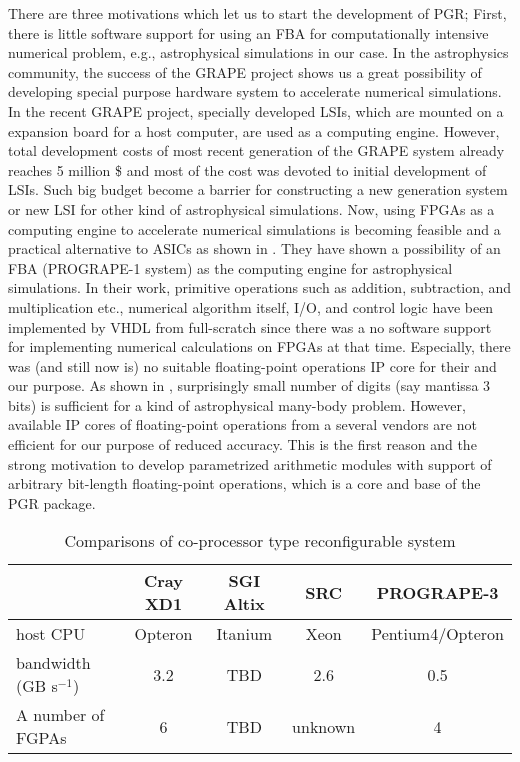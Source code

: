 \documentclass[times, 10pt,twocolumn]{article}
\begin{document}
There are three motivations which let us to start the development of
PGR; First, there is little software support for 
using an FBA for computationally intensive
numerical problem, e.g., astrophysical simulations in our case.
In the astrophysics community, the success of the
GRAPE project \cite{GRAPE} shows us a great possibility of 
developing special purpose hardware system to accelerate 
numerical simulations. In the recent GRAPE project, specially
developed LSIs, which are mounted on a expansion board
for a host computer, are used as a computing engine.
However, total development costs of most recent generation of the
GRAPE system already reaches 5 million \$ and most of the cost
was devoted to initial development of LSIs. 
Such big budget become a barrier for constructing a new generation system
or new LSI for other kind of astrophysical simulations.
Now, using FPGAs as a computing engine 
to accelerate numerical simulations is becoming 
feasible and a practical alternative to ASICs 
as shown in \cite{Hamada2000}.
They have shown a possibility of an FBA (PROGRAPE-1 system)
as the computing engine for astrophysical simulations.
In their work, primitive operations such as addition, subtraction, 
and multiplication etc., numerical algorithm itself, I/O, and control logic
have been implemented by VHDL from full-scratch
since there was a no software support for implementing
numerical calculations on FPGAs at that time.
Especially, there was (and still now is)
no suitable floating-point operations IP core for their and our purpose.
As shown in \cite{Makino1990}, surprisingly small number of digits
(say mantissa 3 bits) is sufficient for a kind of astrophysical many-body problem.
However, available IP cores of floating-point operations
from a several vendors are not efficient for our purpose of reduced accuracy.
This is the first reason and the strong motivation to develop 
parametrized arithmetic modules with support of 
arbitrary bit-length floating-point operations, 
which is a core and base of the PGR package.

\begin{table*}
\caption{Comparisons of co-processor type reconfigurable system}
\begin{center}
\begin{tabular}{lcccc}
\hline
\hline
& Cray XD1 & SGI Altix & SRC  & PROGRAPE-3 \\
\hline
host CPU                & Opteron  & Itanium   & Xeon & Pentium4/Opteron \\
bandwidth (GB s$^{-1}$) & 3.2      & TBD       & 2.6  & 0.5              \\
A number of FGPAs       & 6        & TBD       & unknown & 4             \\
\hline
\hline
\end{tabular}
\end{center}
\label{comparison}
\end{table*}
\end{document}
